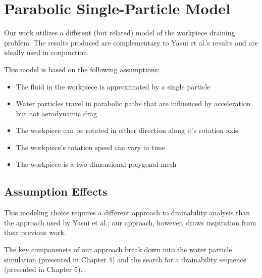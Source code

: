 


\section{Parabolic Single-Particle Model}

Our work utilizes a different (but related) model of the workpiece draining problem. The results produced are complementary to Yasui et al.'s results and are ideally used in conjunction.

This model is based on the following assumptions:

\begin{itemize}
	\item The fluid in the workpiece is approximated by a single particle
	\item Water particles travel in parabolic paths that are influenced by acceleration but not aerodynamic drag
	\item The workpiece can be rotated in either direction along it's rotation axis
	\item The workpiece's rotation speed can vary in time
	\item The workpiece is a two dimensional polygonal mesh
\end{itemize}

	\subsection{Assumption Effects}

This modeling choice requires a different approach to drainability analysis than the approach used by Yasui et al.; our approach, however, draws inspiration from their previous work.

The key componenets of our approach break down into the water particle simulation (presented in Chapter 4) and the search for a drainability sequence (presented in Chapter 5).



